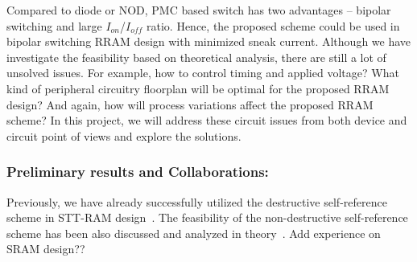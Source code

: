 Compared to diode or NOD, PMC based switch has two advantages -- bipolar switching and large $I_{on}$/$I_{off}$ ratio. Hence, the proposed scheme could be used in bipolar switching RRAM design with minimized sneak current. Although we have investigate the feasibility based on theoretical analysis, there are still a lot of unsolved issues. For example, how to control timing and applied voltage? What kind of peripheral circuitry floorplan will be optimal for the proposed RRAM design? And again, how will process variations affect the proposed RRAM scheme? In this project, we will address these circuit issues from both device and circuit point of views and explore the solutions.


\subsubsection{Preliminary results and Collaborations:}
Previously, we have already successfully utilized the destructive self-reference scheme in STT-RAM design~\cite{Li:147723}. The feasibility of the non-destructive self-reference scheme has been also discussed and analyzed in theory~\cite{Chen:147727}.
Add experience on SRAM design??
